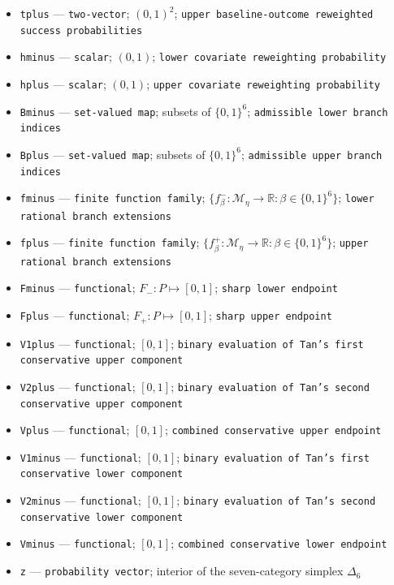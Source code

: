 \documentclass{article}
\begin{document}
\begin{itemize}
  \item \texttt{tplus} --- \texttt{two-\allowbreak{}vector}; \((0,1)^2\); \texttt{upper baseline-\allowbreak{}outcome reweighted success probabilities}
  \item \texttt{hminus} --- \texttt{scalar}; \((0,1)\); \texttt{lower covariate reweighting probability}
  \item \texttt{hplus} --- \texttt{scalar}; \((0,1)\); \texttt{upper covariate reweighting probability}
  \item \texttt{Bminus} --- \texttt{set-\allowbreak{}valued map}; subsets of \(\{0,1\}^6\); \texttt{admissible lower branch indices}
  \item \texttt{Bplus} --- \texttt{set-\allowbreak{}valued map}; subsets of \(\{0,1\}^6\); \texttt{admissible upper branch indices}
  \item \texttt{fminus} --- \texttt{finite function family}; \(\{f^-_\beta:\mathcal M_\eta\to\mathbb R:\beta\in\{0,1\}^6\}\); \texttt{lower rational branch extensions}
  \item \texttt{fplus} --- \texttt{finite function family}; \(\{f^+_\beta:\mathcal M_\eta\to\mathbb R:\beta\in\{0,1\}^6\}\); \texttt{upper rational branch extensions}
  \item \texttt{Fminus} --- \texttt{functional}; \(F_-:P\mapsto[0,1]\); \texttt{sharp lower endpoint}
  \item \texttt{Fplus} --- \texttt{functional}; \(F_+:P\mapsto[0,1]\); \texttt{sharp upper endpoint}
  \item \texttt{V1plus} --- \texttt{functional}; \([0,1]\); \texttt{binary evaluation of Tan's first conservative upper component}
  \item \texttt{V2plus} --- \texttt{functional}; \([0,1]\); \texttt{binary evaluation of Tan's second conservative upper component}
  \item \texttt{Vplus} --- \texttt{functional}; \([0,1]\); \texttt{combined conservative upper endpoint}
  \item \texttt{V1minus} --- \texttt{functional}; \([0,1]\); \texttt{binary evaluation of Tan's first conservative lower component}
  \item \texttt{V2minus} --- \texttt{functional}; \([0,1]\); \texttt{binary evaluation of Tan's second conservative lower component}
  \item \texttt{Vminus} --- \texttt{functional}; \([0,1]\); \texttt{combined conservative lower endpoint}
  \item \texttt{z} --- \texttt{probability vector}; interior of the seven-category simplex \(\Delta_6\)

\end{itemize}
\end{document}
